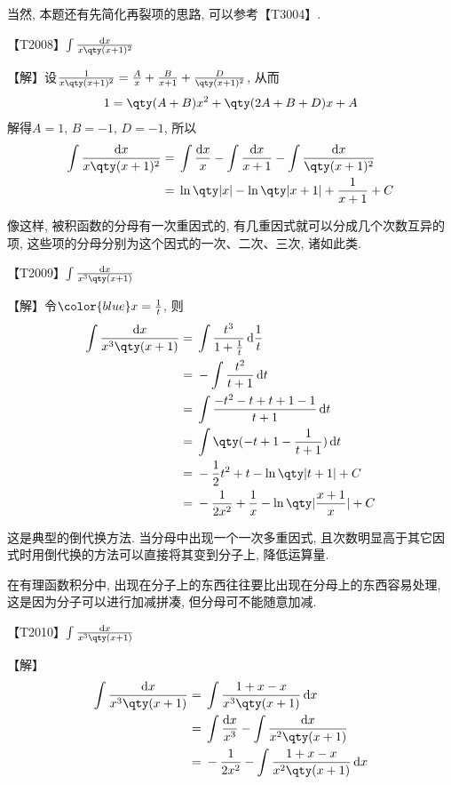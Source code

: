 \documentclass{ctexbook}
\newcommand*{\dif}{\mathop{}\!\mathrm{d}}
\begin{document}
{{当然, 本题还有先简化再裂项的思路, 可以参考{\color{red}【T3004】}. \par}
{\color{red}【T2008】}$\int\frac{\dif{x}}{x\qty(x+1)^{2}}$\par
【解】设$\frac{1}{x\qty(x+1)^{2}}=\frac{A}{x}+\frac{B}{x+1}+\frac{D}{\qty(x+1)^{2}}$, 从而
\begin{align*}
1=\qty(A+B)x^{2}+\qty(2A+B+D)x+A
\end{align*}
解得$A=1,\,B=-1,\,D=-1$, 所以
\begin{align*}
\int\frac{\dif{x}}{x\qty(x+1)^{2}}={}&\int\frac{\dif{x}}{x}-\int\frac{\dif{x}}{x+1}-\int\frac{\dif{x}}{\qty(x+1)^{2}}\\
={}&\ln\qty|x|-\ln\qty|x+1|+\frac{1}{x+1}+C
\end{align*}\par
{\kaishu 像这样, 被积函数的分母有一次重因式的, 有几重因式就可以分成几个次数互异的项, 这些项的分母分别为这个因式的一次、二次、三次, 诸如此类. \par}
{\color{red}【T2009】}$\int\frac{\dif{x}}{x^{3}\qty(x+1)}$\par
【解】令$\color{blue}x=\frac{1}{t}$, 则
\begin{align*}
\int\frac{\dif{x}}{x^{3}\qty(x+1)}={}&\int\frac{t^{3}}{1+\frac{1}{t}}\dif{\frac{1}{t}}\\={}&-\int\frac{t^{2}}{t+1}\dif{t}\\
={}&\int\frac{-t^{2}-t+t+1-1}{t+1}\dif{t}\\
={}&\int\qty(-t+1-\frac{1}{t+1})\dif{t}\\
={}&-\frac{1}{2}t^{2}+t-\ln\qty|t+1|+C\\
={}&-\frac{1}{2x^{2}}+\frac{1}{x}-\ln\qty|\frac{x+1}{x}|+C
\end{align*}\par
{\kaishu 这是典型的倒代换方法. 当分母中出现一个一次多重因式, 且次数明显高于其它因式时用倒代换的方法可以直接将其变到分子上, 降低运算量. \par
在有理函数积分中, 出现在分子上的东西往往要比出现在分母上的东西容易处理, 这是因为分子可以进行加减拼凑, 但分母可不能随意加减. \par}
{\color{red}【T2010】}$\int\frac{\dif{x}}{x^{3}\qty(x+1)}$\par
【解】
\begin{align*}
\int\frac{\dif{x}}{x^{3}\qty(x+1)}={}&\int\frac{1+x-x}{x^{3}\qty(x+1)}\dif{x}\\
={}&\int\frac{\dif{x}}{x^{3}}-\int\frac{\dif{x}}{x^{2}\qty(x+1)}\\
={}&-\frac{1}{2x^{2}}-\int\frac{1+x-x}{x^{2}\qty(x+1)}\dif{x}\\

\end{align*}}
\end{document}
